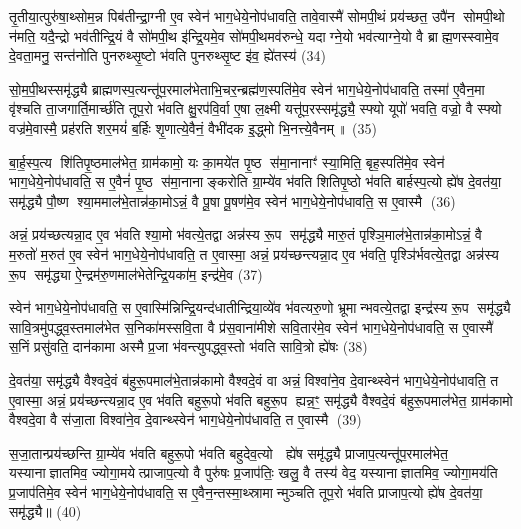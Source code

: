 तृ॒तीया॒त्पुरु॑षा॒थ्सोम॒न्न पिब॑तीन्द्रा॒ग्नी ए॒व स्वेन॑ भाग॒धेये॒नोप॑धावति॒ तावे॒वास्मै॑ सोमपी॒थं प्रय॑च्छत॒ उपै॑न सोमपी॒थो न॑मति॒ यदै॒न्द्रो भव॑तीन्द्रि॒यं वै सो॑मपी॒थ इ॑न्द्रि॒यमे॒व सो॑मपी॒थमव॑रुन्धे॒ यदाग्ने॒यो भव॑त्याग्ने॒यो वै ब्राह्म॒णस्स्वामे॒व दे॒वता॒मनु॒ सन्त॑नोति पुनरुथ्सृ॒ष्टो भ॑वति पुनरुथ्सृ॒ष्ट इ॑व॒ ह्ये॑तस्य॑ (34)

सो॒म॒पी॒थस्समृ॑द्ध्यै ब्राह्मणस्प॒त्यन्तू॑प॒रमाल॑भेताभि॒चर॒न्ब्रह्म॑ण॒स्पति॑मे॒व स्वेन॑ भाग॒धेये॒नोप॑धावति॒ तस्मा॑ ए॒वैन॒मा वृ॑श्चति ता॒जगार्ति॒मार्च्छ॑ति तूप॒रो भ॑वति क्षु॒रप॑वि॒र्वा ए॒षा ल॒क्ष्मी यत्तू॑प॒रस्समृ॑द्ध्यै॒ स्फ्यो यूपो॑ भवति॒ वज्रो॒ वै स्फ्यो वज्र॑मे॒वास्मै॒ प्रह॑रति शर॒मयं॑ ब॒र्\mbox{}हिः शृ॒णात्ये॒वैनं॒ वैभी॑दक इ॒द्ध्मो भि॒नत्त्ये॒वैनम्॥ (35)

{}

बा॒र्\mbox{}ह॒स्प॒त्य शि॑तिपृ॒ष्ठमाल॑भेत॒ ग्राम॑कामो॒ यः का॒मये॑त पृ॒ष्ठ स॑मा॒नानाꣳ॑ स्या॒मिति॒ बृह॒स्पति॑मे॒व स्वेन॑ भाग॒धेये॒नोप॑धावति॒ स ए॒वैनं॑ पृ॒ष्ठ स॑मा॒नानाङ्करोति ग्रा॒म्ये॑व भ॑वति शितिपृ॒ष्ठो भ॑वति बार्\mbox{}हस्प॒त्यो ह्ये॑ष दे॒वत॑या॒ समृ॑द्ध्यै पौ॒ष्ण श्या॒ममाल॑भे॒तान्न॑का॒मोऽन्नं॒ वै पू॒षा पू॒षण॑मे॒व स्वेन॑ भाग॒धेये॒नोप॑धावति॒ स ए॒वास्मै (36)

अन्नं॒ प्रय॑च्छत्यन्ना॒द ए॒व भ॑वति श्या॒मो भ॑वत्ये॒तद्वा अन्न॑स्य रू॒प समृ॑द्ध्यै मारु॒तं पृश्ञि॒माल॑भे॒तान्न॑का॒मोऽन्नं॒ वै म॒रुतो॑ म॒रुत॑ ए॒व स्वेन॑ भाग॒धेये॒नोप॑धावति॒ त ए॒वास्मा॒ अन्नं॒ प्रय॑च्छन्त्यन्ना॒द ए॒व भ॑वति॒ पृश्ञि॑र्भवत्ये॒तद्वा अन्न॑स्य रू॒प समृ॑द्ध्या ऐ॒न्द्रम॑रु॒णमाल॑भेतेन्द्रि॒यका॑म॒ इन्द्र॑मे॒व (37)

स्वेन॑ भाग॒धेये॒नोप॑धावति॒ स ए॒वास्मि॑न्निन्द्रि॒यन्द॑धातीन्द्रिया॒व्ये॑व भ॑वत्यरु॒णो भ्रूमान्भवत्ये॒तद्वा इन्द्र॑स्य रू॒प समृ॑द्ध्यै सावि॒त्रमु॑पद्ध्व॒स्तमाल॑भेत स॒निका॑मस्सवि॒ता वै प्र॑स॒वाना॑मीशे सवि॒तार॑मे॒व स्वेन॑ भाग॒धेये॒नोप॑धावति॒ स ए॒वास्मै॑ स॒निं प्रसु॑वति॒ दान॑कामा अस्मै प्र॒जा भ॑वन्त्युपद्ध्व॒स्तो भ॑वति सावि॒त्रो ह्ये॑षः (38)

दे॒वत॑या॒ समृ॑द्ध्यै वैश्वदे॒वं ब॑हुरू॒पमाल॑भे॒तान्न॑कामो वैश्वदे॒वं वा अन्नं॒ विश्वा॑ने॒व दे॒वान्थ्स्वेन॑ भाग॒धेये॒नोप॑धावति॒ त ए॒वास्मा॒ अन्नं॒ प्रय॑च्छन्त्यन्ना॒द ए॒व भ॑वति बहुरू॒पो भ॑वति बहुरू॒प ह्यन्न॒ꣳ॒ समृ॑द्ध्यै वैश्वदे॒वं ब॑हुरू॒पमाल॑भेत॒ ग्राम॑कामो वैश्वदे॒वा वै स॑जा॒ता विश्वा॑ने॒व दे॒वान्थ्स्वेन॑ भाग॒धेये॒नोप॑धावति॒ त ए॒वास्मै (39)

स॒जा॒तान्प्रय॑च्छन्ति ग्रा॒म्ये॑व भ॑वति बहुरू॒पो भ॑वति बहुदेव॒त्यो  ह्ये॑ष समृ॑द्ध्यै प्राजाप॒त्यन्तू॑प॒रमाल॑भेत॒ यस्यानाज्ञातमिव॒ ज्योगा॒मयेत्प्राजाप॒त्यो वै पुरु॑षः प्र॒जाप॑तिः॒ खलु॒ वै तस्य॑ वेद॒ यस्यानाज्ञातमिव॒ ज्योगा॒मय॑ति प्र॒जाप॑तिमे॒व स्वेन॑ भाग॒धेये॒नोप॑धावति॒ स ए॒वैन॒न्तस्मा॒थ्स्रामान्मुञ्चति तूप॒रो भ॑वति प्राजाप॒त्यो ह्ये॑ष दे॒वत॑या॒ समृ॑द्ध्यै॥ (40)

